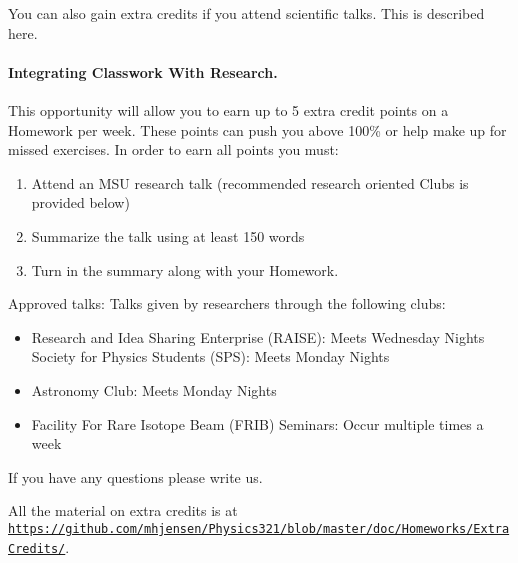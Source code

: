 \documentclass[%
oneside,                 %
final,                   %
10pt]{article}
\begin{document}
\noindent
You can also gain extra credits if you attend scientific talks.
This is described here.

\paragraph{Integrating Classwork With Research.}
This opportunity will allow you to earn up to 5 extra credit points on a Homework per week. These points can push you above 100\% or help make up for missed exercises.
In order to earn all points you must:

\begin{enumerate}
\item Attend an MSU research talk (recommended research oriented Clubs is  provided below)

\item Summarize the talk using at least 150 words

\item Turn in the summary along with your Homework.
\end{enumerate}

\noindent
Approved talks:
Talks given by researchers through the following clubs:
\begin{itemize}
\item Research and Idea Sharing Enterprise (RAISE)​: Meets Wednesday Nights Society for Physics Students (SPS)​: Meets Monday Nights

\item Astronomy Club​: Meets Monday Nights

\item Facility For Rare Isotope Beam (FRIB) Seminars: ​Occur multiple times a week
\end{itemize}

\noindent
If you have any questions please write us.

All the material on extra credits is at \href{{https://github.com/mhjensen/Physics321/blob/master/doc/Homeworks/ExtraCredits/}}{\nolinkurl{https://github.com/mhjensen/Physics321/blob/master/doc/Homeworks/ExtraCredits/}}. 


\end{document}
